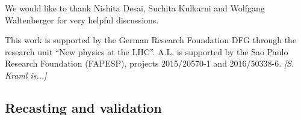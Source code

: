 \documentclass[preprint,number,sort&compress,twocolumn,3p]{elsstyarticle}
\newcommand{\com}[1]{\emph{\color{red}[#1]}}  %
\begin{document}
We would like to thank Nishita Desai, Suchita Kulkarni and Wolfgang Waltenberger for very helpful discussions.

This work is supported by the German Research Foundation DFG through the 
research unit ``New physics at the LHC''. A.L. is supported by the Sao Paulo Research Foundation (FAPESP), projects 2015/20570-1
and 2016/50338-6. \com{S. Kraml is...}




\begin{appendix}

\section{Recasting and validation}\label{app:rec13} 



\end{appendix}
\end{document}
